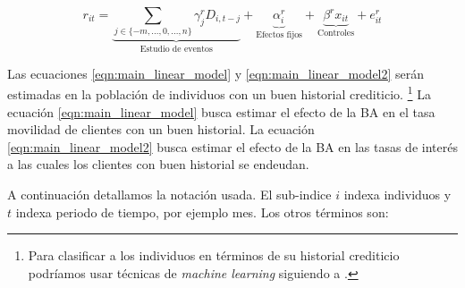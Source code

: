 \documentclass[11pt]{article}
\theoremstyle{plain}
\theoremstyle{plain}
\begin{document}
\begin{equation}
    r_{it} = 
    \underbrace{\sum_{j\in \{-m,..., 0,...,n\}}\gamma_j^r D_{i,t-j}}_{\text{Estudio de eventos}} +
    \underbrace{\alpha_i^r 
    }_{\text{Efectos fijos}} +
    \underbrace{\beta^r x_{it}}_{\text{Controles}} + e_{it}^r 
    \label{eqn:main_linear_model2}
\end{equation}

Las ecuaciones \ref{eqn:main_linear_model} y \ref{eqn:main_linear_model2} serán estimadas en la población de individuos con un buen historial crediticio. \footnote{Para clasificar a los individuos en términos de su historial crediticio podríamos usar técnicas de \textit{machine learning} siguiendo a \textcite{liberman_equilibrium_2018}. }
La ecuación \ref{eqn:main_linear_model} busca estimar el efecto de la BA en el tasa movilidad de clientes con un buen historial. La ecuación \ref{eqn:main_linear_model2} busca estimar el efecto de la BA en las tasas de interés a las cuales los clientes con buen historial se endeudan.

A continuación detallamos la notación usada. El sub-indice $i$ indexa individuos y $t$ indexa periodo de tiempo, por ejemplo mes. Los otros términos son: 
\end{document}
